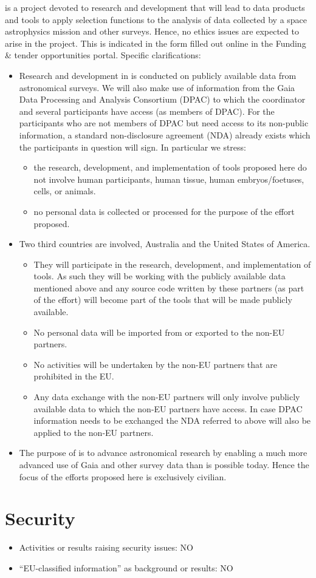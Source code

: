{\acro} is a project devoted to research and development that will lead to data products and tools to apply selection functions to the analysis of data collected by a space astrophysics mission and other surveys. Hence, no ethics issues are expected to arise in the project. This is indicated in the form filled out online in the Funding \& tender opportunities portal. Specific clarifications:
\begin{itemize}
    \item Research and development in {\acro} is conducted on publicly available data from astronomical surveys. We will also make use of information from the Gaia Data Processing and Analysis Consortium (DPAC) to which the coordinator and several participants have access (as members of DPAC). For the participants who are not members of DPAC but need access to its non-public information, a standard non-disclosure agreement (NDA) already exists which the participants in question will sign. In particular we stress:
    \begin{itemize}
        \item the research, development, and implementation of tools proposed here do not involve human participants, human tissue, human embryos/foetuses, cells, or animals.
        \item no personal data is collected or processed for the purpose of the effort proposed.
    \end{itemize}
    \item Two third countries are involved, Australia and the United States of America.
    \begin{itemize}
        \item They will participate in the {\acro} research, development, and implementation of tools. As such they will be working with the publicly available data mentioned above and any source code written by these partners (as part of the {\acro} effort) will become part of the {\acro} tools that will be made publicly available.
        \item No personal data will be imported from or exported to the non-EU partners.
        \item No activities will be undertaken by the non-EU partners that are prohibited in the EU.
        \item Any data exchange with the non-EU partners will only involve publicly available data to which the non-EU partners have access. In case DPAC information needs to be exchanged the NDA referred to above will also be applied to the non-EU partners.
    \end{itemize}
    \item The purpose of {\acro} is to advance astronomical research by enabling a much more advanced use of Gaia and other survey data than is possible today. Hence the focus of the efforts proposed here is exclusively civilian.
\end{itemize}

\section{Security}
\label{sec:security}
\begin{itemize}
\item Activities or results raising security issues: NO
\item ``EU-classified information'' as background or results: NO
\end{itemize}

